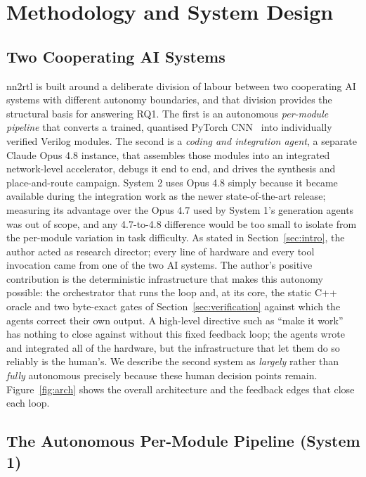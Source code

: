 \documentclass[acmtog,authorversion]{acmart}
\begin{document}
\section{Methodology and System Design}
\label{sec:method}

\subsection{Two Cooperating AI Systems}
\label{sec:twosystems}

nn2rtl is built around a deliberate division of labour between two cooperating AI systems with different autonomy boundaries, and that division provides the structural basis for answering RQ1. The first is an autonomous \emph{per-module pipeline} that converts a trained, quantised PyTorch CNN~\cite{paszke2019} into individually verified Verilog modules. The second is a \emph{coding and integration agent}, a separate Claude Opus 4.8 instance, that assembles those modules into an integrated network-level accelerator, debugs it end to end, and drives the synthesis and place-and-route campaign. System 2 uses Opus 4.8 simply because it became available during the integration work as the newer state-of-the-art release; measuring its advantage over the Opus 4.7 used by System 1's generation agents was out of scope, and any 4.7-to-4.8 difference would be too small to isolate from the per-module variation in task difficulty. As stated in Section~\ref{sec:intro}, the author acted as research director; every line of hardware and every tool invocation came from one of the two AI systems. The author's positive contribution is the deterministic infrastructure that makes this autonomy possible: the orchestrator that runs the loop and, at its core, the static C++ oracle and two byte-exact gates of Section~\ref{sec:verification} against which the agents correct their own output. A high-level directive such as ``make it work'' has nothing to close against without this fixed feedback loop; the agents wrote and integrated all of the hardware, but the infrastructure that let them do so reliably is the human's. We describe the second system as \emph{largely} rather than \emph{fully} autonomous precisely because these human decision points remain. Figure~\ref{fig:arch} shows the overall architecture and the feedback edges that close each loop.

\subsection{The Autonomous Per-Module Pipeline (System 1)}
\label{sec:system1}
\end{document}
